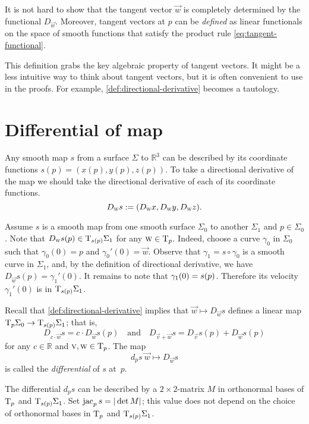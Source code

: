 It is not hard to show that the tangent vector $\vec w$ is completely determined by the functional $D_{\vec w}$.
Moreover, tangent vectors at $p$ can be \emph{defined} as linear functionals on the space of smooth functions
that satisfy the product rule \ref{eq:tangent-functional}.

This definition grabs the key algebraic property of tangent vectors.
It might be a less intuitive way to think about tangent vectors, but it is often convenient to use in the proofs. 
For example, \ref{def:directional-derivative} becomes a tautology.

\section{Differential of map}\label{sec:differential}

Any smooth map $s$ from a surface $\Sigma$ to $\mathbb{R}^3$ can be described by its coordinate functions 
$ s(p)=(x(p),y(p),z(p))$. 
To take a directional derivative of the map we should take the  directional derivative of each of its coordinate functions.
\[D_{\text{\sc{w}}} s\mathrel{:=}(D_{\text{\sc{w}}}x,D_{\text{\sc{w}}}y,D_{\text{\sc{w}}}z).\]

Assume $s$ is a smooth map from one smooth surface $\Sigma_0$ to another $\Sigma_1$ and $p\in \Sigma_0$.
Note that $D_{\text{\sc{w}}} s(p)\in \mathrm{T}_{s(p)}\Sigma_1$ for any $\text{\sc{w}}\in \mathrm{T}_p$.
Indeed, choose a curve $\gamma_0$ in $\Sigma_0$ such that $\gamma_0(0)=p$ and $\gamma_0'(0)=\vec w$.
Observe that $\gamma_1= s\circ \gamma_0$ is a smooth curve in $\Sigma_1$, and, 
by the definition of directional derivative, we have $D_{\vec w} s(p)=\gamma_1'(0)$.
It remains to note that $\gamma_1(0)\z= s(p)$.
Therefore its velocity $\gamma_1'(0)$ is in $\mathrm{T}_{ s(p)}\Sigma_1$.

Recall that \ref{def:directional-derivative} implies that 
$\vec w \mapsto D_{\vec w} s$ defines a linear map $\T_p\Sigma_0\z\to \T_{ s(p)}\Sigma_1$;
that is,
\[D_{c\cdot \vec w} s=c\cdot D_{\vec w} s(p)
\quad\text{and}\quad D_{\vec v+ \vec w} s=D_{\vec v} s(p)+ D_{\vec w} s(p)\]
for any $c\in\mathbb{R}$ and $\text{\sc{v}}, \text{\sc{w}}\in\mathrm{T}_p$.
The map 
\[d_p s\:\vec w \mapsto D_{\vec w} s\] 
is called the \emph{differential} of $s$ at~$p$.

The differential $d_p s$ can be described by a $2{\times}2$-matrix $M$ in orthonormal bases of $\mathrm{T}_p$ and $\mathrm{T}_{s(p)}\Sigma_1$.
Set $\mathop{\rm jac}\nolimits_p s=|\det M|$; this value  
does not depend on the choice of orthonormal bases in $\mathrm{T}_p$ and $\mathrm{T}_{s(p)}\Sigma_1$. \label{page:|L|}

